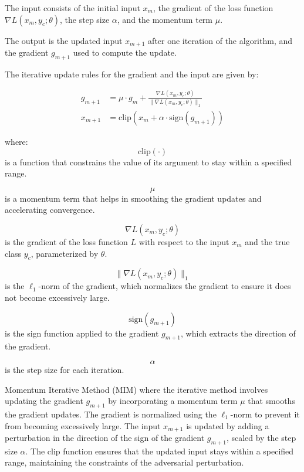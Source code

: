 The input consists of the initial input $x_m$, the gradient of the loss function $\nabla L(x_m, y_c; \theta)$, the step size $\alpha$, and the momentum term $\mu$.

The output is the updated input $x_{m+1}$ after one iteration of the algorithm, and the gradient $g_{m+1}$ used to compute the update.

The iterative update rules for the gradient and the input are given by:

\begin{align}
g_{m+1} &= \mu \cdot g_m + \frac{\nabla L(x_m, y_c; \theta)}{\|\nabla L(x_m, y_c; \theta)\|_1} \\
x_{m+1} &= \text{clip} \left( x_m + \alpha \cdot \text{sign}(g_{m+1}) \right)
\end{align}

where:
\begin{equation*}
\text{clip}(\cdot)
\end{equation*}
is a function that constrains the value of its argument to stay within a specified range.

\begin{equation*}
\mu
\end{equation*}
is a momentum term that helps in smoothing the gradient updates and accelerating convergence.

\begin{equation*}
\nabla L(x_m, y_c; \theta)
\end{equation*}
is the gradient of the loss function $L$ with respect to the input $x_m$ and the true class $y_c$, parameterized by $\theta$.

\begin{equation*}
\|\nabla L(x_m, y_c; \theta)\|_1
\end{equation*}
is the $\ell_1$-norm of the gradient, which normalizes the gradient to ensure it does not become excessively large.

\begin{equation*}
\text{sign}(g_{m+1})
\end{equation*}
is the sign function applied to the gradient $g_{m+1}$, which extracts the direction of the gradient.

\begin{equation*}
\alpha
\end{equation*}
is the step size for each iteration.

Momentum Iterative Method (MIM) where the iterative method involves updating the gradient $g_{m+1}$ by incorporating a momentum term $\mu$ that smooths the gradient updates. The gradient is normalized using the $\ell_1$-norm to prevent it from becoming excessively large. The input $x_{m+1}$ is updated by adding a perturbation in the direction of the sign of the gradient $g_{m+1}$, scaled by the step size $\alpha$. The $\text{clip}$ function ensures that the updated input stays within a specified range, maintaining the constraints of the adversarial perturbation.
